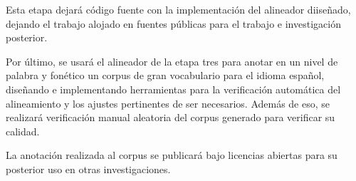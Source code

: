 Esta etapa dejará código fuente con la implementación del alineador diiseñado, dejando el trabajo alojado en fuentes públicas para el trabajo e investigación posterior.

Por último, se usará el alineador de la etapa tres para anotar en un nivel de palabra y fonético un corpus de gran vocabulario para el idioma español, diseñando e implementando herramientas para la verificación automática del alineamiento y los ajustes pertinentes de ser necesarios. Además de eso, se realizará verificación manual aleatoria del corpus generado para verificar su calidad.

La anotación realizada al corpus se publicará bajo licencias abiertas para su posterior uso en otras investigaciones.